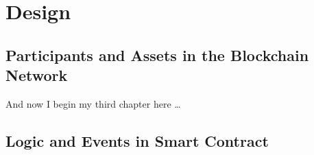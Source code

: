 \chapter{Design}

\section{Participants and Assets in the Blockchain Network}
And now I begin my third chapter here \dots

\section{Logic and Events in Smart Contract}